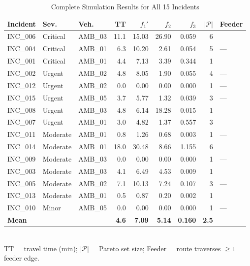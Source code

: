 \documentclass[paper=A4, 12pt, mathscr]{report}
\begin{document}
	\begin{table}[H]
		\centering
		\caption{Complete Simulation Results for All 15 Incidents}
		\label{tab:results}
		\small
		\begin{tabular}{lllrrrrrl}
			\hline
			\textbf{Incident} & \textbf{Sev.} & \textbf{Veh.}
			& \textbf{TT} & \textbf{$f_1'$} & \textbf{$f_2$}
			& \textbf{$f_3$} & \textbf{$|\mathcal{P}|$}
			& \textbf{Feeder} \\
			\hline
			INC\_006 & Critical  & AMB\_03 & 11.1 & 15.03 & 26.90 & 0.059 & 6  & \checkmark \\
			INC\_004 & Critical  & AMB\_01 &  6.3 & 10.20 &  2.61 & 0.054 & 5  & --- \\
			INC\_001 & Critical  & AMB\_01 &  4.4 &  7.13 &  3.39 & 0.344 & 1  & \checkmark \\
			INC\_002 & Urgent    & AMB\_02 &  4.8 &  8.05 &  1.90 & 0.055 & 4  & --- \\
			INC\_012 & Urgent    & AMB\_02 &  0.0 &  0.00 &  0.00 & 0.000 & 1  & --- \\
			INC\_015 & Urgent    & AMB\_05 &  3.7 &  5.77 &  1.32 & 0.039 & 3  & --- \\
			INC\_008 & Urgent    & AMB\_03 &  4.8 &  6.14 & 18.28 & 0.015 & 1  & \checkmark \\
			INC\_007 & Urgent    & AMB\_01 &  3.0 &  4.82 &  1.37 & 0.557 & 3  & \checkmark \\
			INC\_011 & Moderate  & AMB\_01 &  0.8 &  1.26 &  0.68 & 0.003 & 1  & --- \\
			INC\_014 & Moderate  & AMB\_01 & 18.0 & 30.48 &  8.66 & 1.155 & 6  & \checkmark \\
			INC\_009 & Moderate  & AMB\_03 &  0.0 &  0.00 &  0.00 & 0.000 & 1  & --- \\
			INC\_003 & Moderate  & AMB\_03 &  4.1 &  6.49 &  4.53 & 0.009 & 1  & \checkmark \\
			INC\_005 & Moderate  & AMB\_02 &  7.1 & 10.13 &  7.24 & 0.107 & 3  & --- \\
			INC\_013 & Moderate  & AMB\_01 &  0.5 &  0.87 &  0.20 & 0.002 & 1  & \checkmark \\
			INC\_010 & Minor     & AMB\_05 &  0.0 &  0.00 &  0.00 & 0.000 & 1  & --- \\
			\hline
			\textbf{Mean} & & & \textbf{4.6} & \textbf{7.09} & \textbf{5.14}
			& \textbf{0.160} & \textbf{2.5} & \\
			\hline
		\end{tabular}
		\smallskip\\
		\small TT = travel time (min); $|\mathcal{P}|$ = Pareto set size;
		Feeder = route traverses $\geq 1$ feeder edge.
	\end{table}
	
\end{document}
